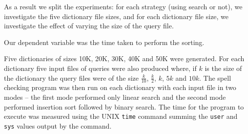 \documentclass[a4]{article}
\begin{document}
As a result we split the experiments: for each strategy (using search or not), we investigate the five dictionary file sizes, and for each dictionary file size, we investigate the effect of varying the size of the query file.

Our dependent variable was the time taken to perform the sorting.

Five dictionaries of sizes 10K, 20K, 30K, 40K and 50K were generated.    For each dictionary five input files of queries were also produced where, if $k$ is the size of the dictionary the query files were of the size $\frac{k}{10}$, $\frac{k}{2}$, $k$, $5k$ and $10k$.  The spell checking program was then run on each dictionary with each input file in two modes -- the first mode performed only linear search and the second mode performed insertion sort followed by binary search.  The time for the program to execute was measured using the UNIX \texttt{time} command summing the \texttt{user} and \texttt{sys} values output by the command.  
\end{document}
